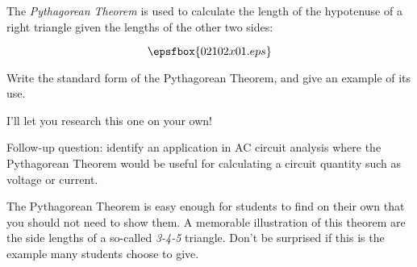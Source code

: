 

The {\it Pythagorean Theorem} is used to calculate the length of the hypotenuse of a right triangle given the lengths of the other two sides:

$$\epsfbox{02102x01.eps}$$

Write the standard form of the Pythagorean Theorem, and give an example of its use.







I'll let you research this one on your own!

\vskip 10pt

Follow-up question: identify an application in AC circuit analysis where the Pythagorean Theorem would be useful for calculating a circuit quantity such as voltage or current.







The Pythagorean Theorem is easy enough for students to find on their own that you should not need to show them.  A memorable illustration of this theorem are the side lengths of a so-called {\it 3-4-5} triangle.  Don't be surprised if this is the example many students choose to give.




